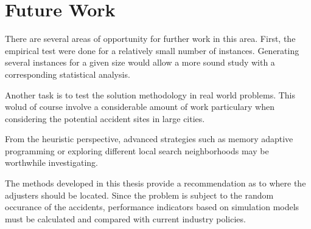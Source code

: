 \section{Future Work}
There are
several areas of opportunity
for further work in this area.
First,
the empirical test
were done for a relatively
small number of instances.
Generating several instances
for a given size
would allow
a more sound study
with a corresponding statistical analysis.

Another task
is to test the solution methodology
in real world problems.
This wolud of course
involve a considerable amount of work
particulary
when considering the potential accident sites
in large cities.

From the heuristic perspective,
advanced strategies
such as memory adaptive programming
or exploring different local search neighborhoods
may be worthwhile investigating.

The methods developed in this thesis
provide a recommendation as to where the adjusters should be located.
Since the problem is subject to the random occurance of the accidents,
performance indicators based on simulation models
must be calculated and compared with current industry policies.
